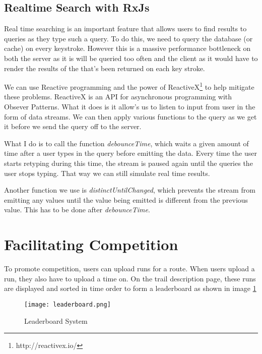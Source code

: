 \subsection{Realtime Search with RxJs}
Real time searching is an important feature that allows users to find results to queries as they type such a query. To do this, we need to query the database (or cache) on every keystroke. However this is a massive performance bottleneck on both the server as it is will be queried too often and the client as it would have to render the results of the that's been returned on each key stroke.

We can use Reactive programming and the power of ReactiveX\footnote{http://reactivex.io/} to help mitigate these problems. ReactiveX is an API for asynchronous programming with Obsever Patterns. What it does is it allow's us to listen to input from user in the form of data streams. We can then apply various functions to the query as we get it before we send the query off to the server. 

What I do is to call the function \textit{debounceTime}, which waits a given amount of time after a user types in the query before emitting the data. Every time the user starts retyping during this time, the stream is paused again until the queries the user stops typing. That way we can still simulate real time results.

Another function we use is \textit{distinctUntilChanged}, which prevents the stream from emitting any values until the value being emitted is different from the previous value. This has to be done after \textit{debounceTime}.

\section{Facilitating Competition}
To promote competition, users can upload runs for a route. When users upload a run, they also have to upload a time on. On the trail description page, these runs are displayed and sorted in time order to form a leaderboard as shown in image \ref{fig:leaderboard8}

\begin{figure}[ht]
    \centering
    \texttt{[image: leaderboard.png]}
    \caption{Leaderboard System}
    \label{fig:leaderboard8}
\end{figure}